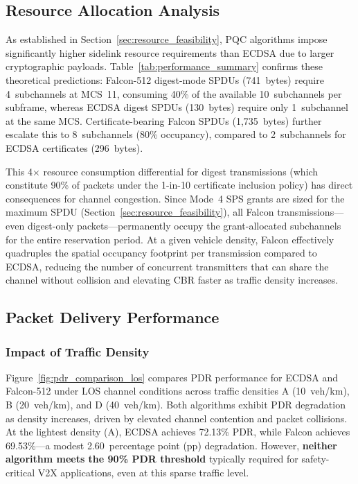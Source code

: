 \documentclass[letterpaper,journal]{IEEEtran}
\begin{document}
\subsection{Resource Allocation Analysis}

As established in Section~\ref{sec:resource_feasibility}, PQC algorithms impose significantly higher sidelink resource requirements than ECDSA due to larger cryptographic payloads. Table~\ref{tab:performance_summary} confirms these theoretical predictions: Falcon-512 digest-mode SPDUs (741~bytes) require 4~subchannels at MCS~11, consuming 40\% of the available 10~subchannels per subframe, whereas ECDSA digest SPDUs (130~bytes) require only 1~subchannel at the same MCS. Certificate-bearing Falcon SPDUs (1{,}735~bytes) further escalate this to 8~subchannels (80\% occupancy), compared to 2~subchannels for ECDSA certificates (296~bytes).

This 4$\times$ resource consumption differential for digest transmissions (which constitute 90\% of packets under the 1-in-10 certificate inclusion policy) has direct consequences for channel congestion. Since Mode~4 SPS grants are sized for the maximum SPDU (Section~\ref{sec:resource_feasibility}), all Falcon transmissions---even digest-only packets---permanently occupy the grant-allocated subchannels for the entire reservation period. At a given vehicle density, Falcon effectively quadruples the spatial occupancy footprint per transmission compared to ECDSA, reducing the number of concurrent transmitters that can share the channel without collision and elevating CBR faster as traffic density increases.

\subsection{Packet Delivery Performance}

\subsubsection{Impact of Traffic Density}

Figure~\ref{fig:pdr_comparison_los} compares PDR performance for ECDSA and Falcon-512 under LOS channel conditions across traffic densities A (10~veh/km), B (20~veh/km), and D (40~veh/km). Both algorithms exhibit PDR degradation as density increases, driven by elevated channel contention and packet collisions. At the lightest density (A), ECDSA achieves 72.13\% PDR, while Falcon achieves 69.53\%---a modest 2.60~percentage point (pp) degradation. However, \textbf{neither algorithm meets the 90\% PDR threshold} typically required for safety-critical V2X applications, even at this sparse traffic level.
\end{document}
